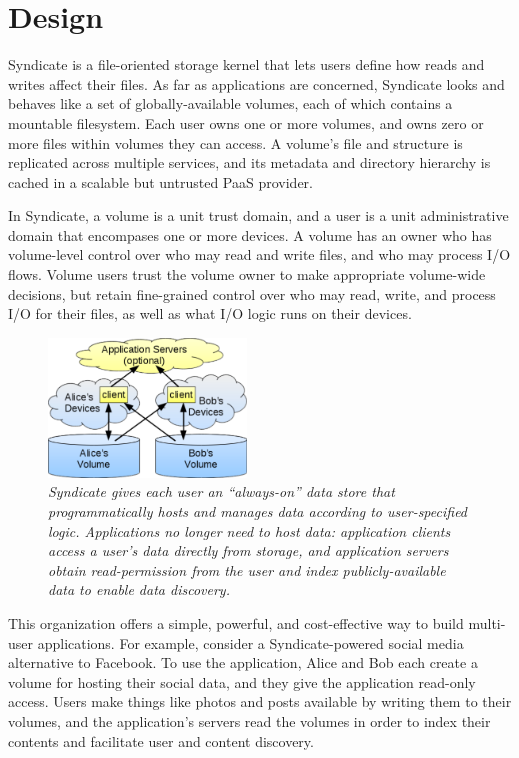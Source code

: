 \section{Design}
\label{sec:design}

Syndicate is a file-oriented storage kernel that lets users define how reads and
writes affect their files.  As far as applications are concerned, Syndicate looks
and behaves like a set of globally-available volumes, each of which contains a
mountable filesystem. Each user owns one or more volumes, and owns zero or more
files within volumes they can access.  A volume's file and structure is replicated across
multiple services, and its metadata and directory hierarchy is cached in a
scalable but untrusted PaaS provider.

In Syndicate, a volume is a unit trust domain, and a user is a unit
administrative domain that encompases one or more devices.  A volume has an
owner who has volume-level control over who may read and write files, and who
may process I/O flows. Volume users trust the volume owner to make appropriate
volume-wide decisions, but retain fine-grained control over who may read, write,
and process I/O for their files, as well as what I/O logic runs on their
devices.

\begin{figure}[t!]
\centering
\includegraphics[width=0.47\textwidth]{figures/app-overview}
\caption{\it
Syndicate gives each user an ``always-on'' data store that programmatically
hosts and manages data according to user-specified logic.  Applications no
longer need to host data:  application clients access a user's data directly from storage,
and application servers obtain read-permission from the user and
index publicly-available data to enable data discovery.}
\label{fig:app-overview}
\end{figure}

This organization offers a simple, powerful, and cost-effective way to build multi-user
applications. For example, consider a Syndicate-powered social media alternative
to Facebook. To use the application, Alice and Bob each create a volume for
hosting their social data, and they give the application read-only access. Users
make things like photos and posts available by writing them to their volumes,
and the application's servers read the volumes in order to index their
contents and facilitate user and content discovery.

